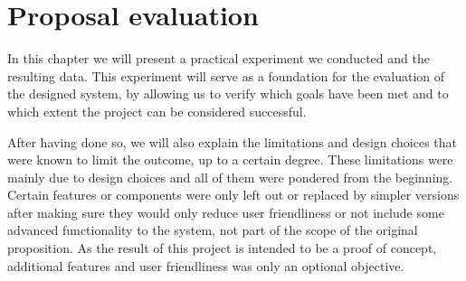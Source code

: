 \chapter{Proposal evaluation} \label{chap:eval}
In this chapter we will present a practical experiment we conducted and the resulting data.
This experiment will serve as a foundation for the evaluation of the designed system, by allowing us to verify which goals have been met and to which extent the project can be considered successful.

After having done so, we will also explain the limitations and design choices that were known to limit the outcome, up to a certain degree.
These limitations were mainly due to design choices and all of them were pondered from the beginning.
Certain features or components were only left out or replaced by simpler versions after making sure they would only reduce user friendliness or not include some advanced functionality to the system, not part of the scope of the original proposition.
As the result of this project is intended to be a proof of concept, additional features and user friendliness was only an optional objective.








